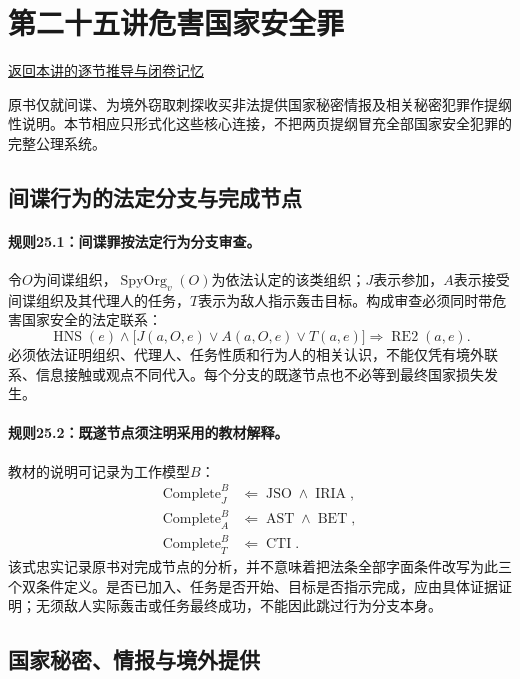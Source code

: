 \section{第二十五讲\quad 危害国家安全罪}

\label{ref:lecture:25}

\noindent\hyperref[lecture:25]{返回本讲的逐节推导与闭卷记忆}

原书仅就间谍、为境外窃取刺探收买非法提供国家秘密情报及相关秘密犯罪作提纲性说明。本节相应只形式化这些核心连接，不把两页提纲冒充全部国家安全犯罪的完整公理系统。

\subsection{间谍行为的法定分支与完成节点}
\paragraph{规则25.1：间谍罪按法定行为分支审查。}
令$O$为间谍组织，$\operatorname{SpyOrg}_v(O)$为依法认定的该类组织；$J$表示参加，$A$表示接受间谍组织及其代理人的任务，$T$表示为敌人指示轰击目标。构成审查必须同时带危害国家安全的法定联系：
\[
\operatorname{HNS}(e)\land
\bigl[J(a,O,e)\lor A(a,O,e)\lor T(a,e)\bigr]
\Rightarrow\operatorname{RE2}(a,e).
\]
必须依法证明组织、代理人、任务性质和行为人的相关认识，不能仅凭有境外联系、信息接触或观点不同代入。每个分支的既遂节点也不必等到最终国家损失发生。

\paragraph{规则25.2：既遂节点须注明采用的教材解释。}
教材的说明可记录为工作模型$B$：
\[
\begin{aligned}
\operatorname{Complete}^{B}_{J}&\Leftarrow
\operatorname{JSO}\land\operatorname{IRIA},\\
\operatorname{Complete}^{B}_{A}&\Leftarrow
\operatorname{AST}\land\operatorname{BET},\\
\operatorname{Complete}^{B}_{T}&\Leftarrow
\operatorname{CTI}.
\end{aligned}
\]
该式忠实记录原书对完成节点的分析，并不意味着把法条全部字面条件改写为此三个双条件定义。是否已加入、任务是否开始、目标是否指示完成，应由具体证据证明；无须敌人实际轰击或任务最终成功，不能因此跳过行为分支本身。

\subsection{国家秘密、情报与境外提供}
